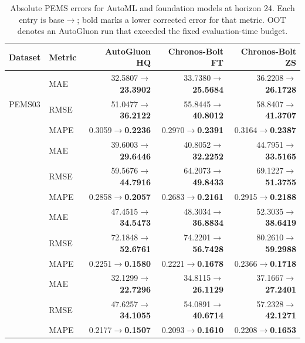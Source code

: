 \begin{table}[t]
\centering
\small
\setlength{\tabcolsep}{5pt}
\caption{Absolute PEMS errors for AutoML and foundation models at horizon 24. Each entry is base$\rightarrow$\method{}; bold marks a lower corrected error for that metric. OOT denotes an AutoGluon run that exceeded the fixed evaluation-time budget.}
\label{tab:strong-pems-absolute-external}
\begin{tabular}{llrrr}
\toprule
Dataset & Metric & \shortstack{AutoGluon\\HQ} & \shortstack{Chronos-Bolt\\FT} & \shortstack{Chronos-Bolt\\ZS}\\
\midrule
\multirow{3}{*}{PEMS03} & MAE & 32.5807$\rightarrow$\textbf{23.3902} & 33.7380$\rightarrow$\textbf{25.5684} & 36.2208$\rightarrow$\textbf{26.1728}\\
 & RMSE & 51.0477$\rightarrow$\textbf{36.2122} & 55.8445$\rightarrow$\textbf{40.8012} & 58.8407$\rightarrow$\textbf{41.3707}\\
 & MAPE & 0.3059$\rightarrow$\textbf{0.2236} & 0.2970$\rightarrow$\textbf{0.2391} & 0.3164$\rightarrow$\textbf{0.2387}\\
\addlinespace[1pt]
\multirow{3}{*}{PEMS04} & MAE & 39.6003$\rightarrow$\textbf{29.6446} & 40.8052$\rightarrow$\textbf{32.2252} & 44.7951$\rightarrow$\textbf{33.5165}\\
 & RMSE & 59.5676$\rightarrow$\textbf{44.7916} & 64.2073$\rightarrow$\textbf{49.8433} & 69.1227$\rightarrow$\textbf{51.3755}\\
 & MAPE & 0.2858$\rightarrow$\textbf{0.2057} & 0.2683$\rightarrow$\textbf{0.2161} & 0.2915$\rightarrow$\textbf{0.2188}\\
\addlinespace[1pt]
\multirow{3}{*}{PEMS07} & MAE & 47.4515$\rightarrow$\textbf{34.5473} & 48.3034$\rightarrow$\textbf{36.8834} & 52.3035$\rightarrow$\textbf{38.6419}\\
 & RMSE & 72.1848$\rightarrow$\textbf{52.6761} & 74.2201$\rightarrow$\textbf{56.7428} & 80.2610$\rightarrow$\textbf{59.2988}\\
 & MAPE & 0.2251$\rightarrow$\textbf{0.1580} & 0.2221$\rightarrow$\textbf{0.1678} & 0.2366$\rightarrow$\textbf{0.1718}\\
\addlinespace[1pt]
\multirow{3}{*}{PEMS08} & MAE & 32.1299$\rightarrow$\textbf{22.7296} & 34.8115$\rightarrow$\textbf{26.1129} & 37.1667$\rightarrow$\textbf{27.2401}\\
 & RMSE & 47.6257$\rightarrow$\textbf{34.1055} & 54.0891$\rightarrow$\textbf{40.6714} & 57.2328$\rightarrow$\textbf{42.1271}\\
 & MAPE & 0.2177$\rightarrow$\textbf{0.1507} & 0.2093$\rightarrow$\textbf{0.1610} & 0.2208$\rightarrow$\textbf{0.1653}\\
\bottomrule
\end{tabular}
\end{table}
